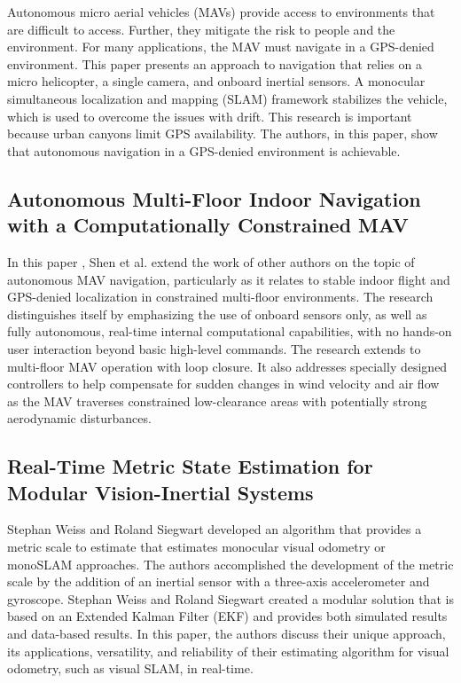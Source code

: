 Autonomous micro aerial vehicles (MAVs) provide access to environments that are difficult to access. Further, they mitigate the risk to people and the environment. For many applications, the MAV must navigate in a GPS-denied environment. This paper presents an approach to navigation that relies on a micro helicopter, a single camera, and onboard inertial sensors. A monocular simultaneous localization and mapping (SLAM) framework stabilizes the vehicle, which is used to overcome the issues with drift. This research is important because urban canyons limit GPS availability. The authors, in this paper, show that autonomous navigation in a GPS-denied environment is achievable.

\subsection{Autonomous Multi-Floor Indoor Navigation with a Computationally Constrained MAV}

In this paper \cite{Shen2011}, Shen et al. extend the work of other authors on the topic of autonomous MAV navigation, particularly as it relates to stable indoor flight and GPS-denied localization in constrained multi-floor environments. The research distinguishes itself by emphasizing the use of onboard sensors only, as well as fully autonomous, real-time internal computational capabilities, with no hands-on user interaction beyond basic high-level commands. The research extends to multi-floor MAV operation with loop closure. It also addresses specially designed controllers to help compensate for sudden changes in wind velocity and air flow as the MAV traverses constrained low-clearance areas with potentially strong aerodynamic disturbances.

\subsection{Real-Time Metric State Estimation for Modular Vision-Inertial Systems}

Stephan Weiss and Roland Siegwart developed an algorithm that provides a metric scale to estimate that estimates monocular visual odometry or monoSLAM approaches. The authors accomplished the development of the metric scale by the addition of an inertial sensor with a three-axis accelerometer and gyroscope. Stephan Weiss and Roland Siegwart created a modular solution that is based on an Extended Kalman Filter (EKF) and provides both simulated results and data-based results. In this paper, the authors discuss their unique approach, its applications, versatility, and reliability of their estimating algorithm for visual odometry, such as visual SLAM, in real-time.

